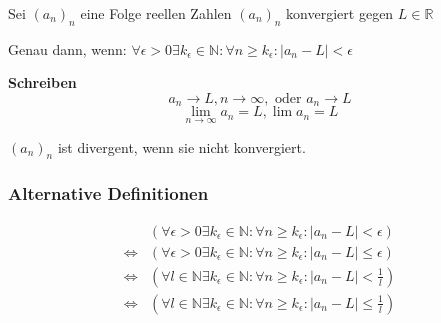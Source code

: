 \documentclass[fleqn]{scrbook}
\begin{document}
Sei $(a_n)_n$ eine Folge reellen Zahlen $(a_n)_n$ konvergiert gegen $L \in \mathbb{R}$

Genau dann, wenn: $\forall \epsilon > 0 \exists k_\epsilon \in \mathbb{N}: \forall n \geq k_\epsilon: |a_n - L| < \epsilon$

\textbf{Schreiben} 
\[a_n \to L, n\to \infty, \text{ oder } a_n \to L\]
\[\lim_{n \to \infty} a_n = L, \lim a_n = L\]

$(a_n)_n$ ist divergent, wenn sie nicht konvergiert.

\subsubsection{Alternative Definitionen} 

\begin{align*}
                      & \left(\forall \epsilon > 0 \exists k_\epsilon \in \mathbb{N}: \forall n \geq k_\epsilon: |a_n - L| < \epsilon \right) \\
  \Longleftrightarrow & \left(\forall \epsilon > 0 \exists k_\epsilon \in \mathbb{N}: \forall n \geq k_\epsilon: |a_n - L| \leq \epsilon \right) \\
  \Longleftrightarrow & \left(\forall l \in \mathbb{N} \exists k_\epsilon \in \mathbb{N}: \forall n \geq k_\epsilon: |a_n - L| < \frac{1}{l} \right) \\
  \Longleftrightarrow & \left(\forall l \in \mathbb{N} \exists k_\epsilon \in \mathbb{N}: \forall n \geq k_\epsilon: |a_n - L| \leq \frac{1}{l} \right) 
\end{align*}
\end{document}
